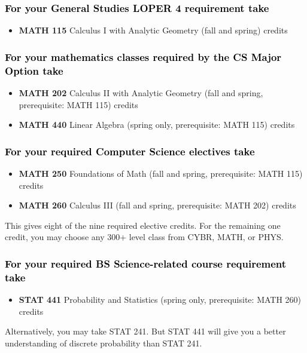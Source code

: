 \documentclass[10pt]{article}
\newenvironment{mypar}[2]
   {\begin{list}{}%
     {\setlength\leftmargin{#1}
     \setlength\rightmargin{#2}}
     \item[]}
   {\end{list}}
\newcommand{\calcone}{\textbf{MATH 115} Calculus I with Analytic Geometry (fall and spring) \dotfill 5 credits}
\newcommand{\calctwo}{\textbf{MATH 202} Calculus II with Analytic Geometry (fall and spring, prerequisite: MATH 115) \dotfill 5 credits }
\newcommand{\foundations}{\textbf{MATH 250} Foundations of Math (fall and spring, prerequisite: MATH 115)  \dotfill 3 credits}
\newcommand{\calcthree}{\textbf{MATH 260} Calculus III  (fall and spring, prerequisite: MATH 202) \dotfill 5 credits}
\newcommand{\linear}{\textbf{MATH 440} Linear Algebra (spring only, prerequisite: MATH 115) \dotfill 3 credits}
\newcommand{\statistics}{\textbf{STAT 441} Probability and Statistics (spring only, prerequisite: MATH 260)  \dotfill  3 credits}
\begin{document}
\vspace{-0.1in}

\subsubsection*{\textcolor{black}{For  your General Studies LOPER 4 requirement take}}
\begin{itemize}
\item  \calcone
\end{itemize}

\vspace{-0.1in}
\subsubsection*{\textcolor{black}{For your mathematics classes required by the CS Major Option take}}
\begin{itemize}
\item \calctwo
\item \linear
\end{itemize}

\vspace{-0.1in}
\subsubsection*{\textcolor{black}{For your required Computer Science electives take}}

\begin{itemize}
\item \foundations
\item \calcthree
\end{itemize}
\vspace{-0.1in}
\begin{mypar}{0.5cm}{0.5cm} This gives eight of the nine required elective credits. For the remaining one credit, you may choose any 300+ level class from CYBR,  MATH, or PHYS.
\end{mypar}
\vspace{-0.2in}
\subsubsection*{\textcolor{black}{For your required BS Science-related course requirement take}}
\begin{itemize}
\item \statistics
\end{itemize}
\vspace{-0.1in}
\begin{mypar}{0.5cm}{0.5cm}Alternatively, you may take STAT 241. But STAT 441 will give you  a  better understanding of discrete probability than STAT 241.
\end{mypar}
\vspace{-0.1in}
\end{document}
